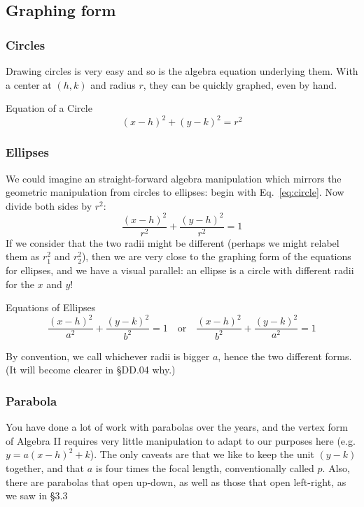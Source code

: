 \subsection{Graphing form}
\subsubsection{Circles}
Drawing circles is very easy and so is the algebra equation underlying them.  With a center
at $(h,k)$ and radius $r$, they can be quickly graphed, even by hand.

\begin{derivation}{Equation of a Circle}
\label{eq:circle}
\begin{equation}
(x-h)^2+(y-k)^2=r^2
\end{equation}
\end{derivation}

\subsubsection{Ellipses}
We could imagine an straight-forward algebra manipulation which mirrors the geometric
manipulation from circles to ellipses: begin with Eq.~\ref{eq:circle}.  Now divide both sides 
by $r^2$:
$$
\frac{(x-h)^2}{r^2} + \frac{(y-h)^2}{r^2} = 1
$$
If we consider that the two radii might be different (perhaps we might relabel them as $r_1^2$
and $r_2^2$), then we are very close to the graphing form of the equations for ellipses, and
we have a visual parallel: an ellipse is a circle with different radii for the $x$ and $y$!

\begin{derivation}{Equations of Ellipses}
\begin{equation}
\label{eq:ellipses}
\frac{(x-h)^2}{a^2} + \frac{(y-k)^2}{b^2} = 1 \quad \text{or} \quad \frac{(x-h)^2}{b^2} + \frac{(y-k)^2}{a^2} = 1
\end{equation}
\end{derivation}
By convention, we call whichever radii is bigger $a$, hence the two different forms.  (It will become
clearer in §DD.04 why.)

\subsubsection{Parabola}
You have done a lot of work with parabolas over the years, and the vertex form of Algebra II
requires very little manipulation to adapt to our purposes here (e.g. $y=a(x-h)^2+k$).  The only
caveats are that we like to keep the unit $(y-k)$ together, and that $a$ is four times the focal
length, conventionally called $p$.  Also, there are parabolas that open up-down, as well
as those that open left-right, as we saw in §3.3

